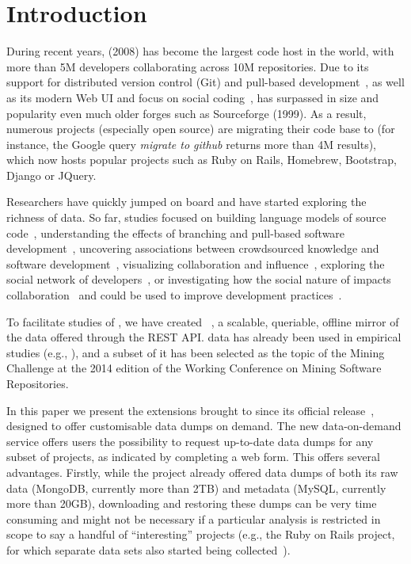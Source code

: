 
\section{Introduction}
\label{sec:intro}

During recent years, \gh (2008) has become the largest code host in the world, with more than 5M developers
collaborating across 10M repositories.
Due to its support for distributed version control (Git) and pull-based development~\cite{barr2012cohesive}, 
as well as its modern Web UI and focus on social coding~\cite{dabbish2012social}, \gh has surpassed in size
and popularity even much older forges such as Sourceforge (1999).
As a result, numerous projects (especially open source) are migrating their code base to \gh (for instance, 
the Google query \emph{migrate to github} returns more than 4M results), which now hosts popular projects
such as Ruby on Rails, Homebrew, Bootstrap, Django or JQuery.

Researchers have quickly jumped on board and have started exploring the richness of \gh data.
So far, studies focused on 
building language models of source code~\cite{allamanis2013mining}, 
understanding the effects of branching and pull-based software development~\cite{lee2013git, gousios2014exploratory}, 
uncovering associations between crowdsourced knowledge and software development~\cite{vasilescu2013stackoverflow},
visualizing collaboration and influence~\cite{heller2011visualizing}, 
exploring the social network of developers~\cite{thung2013network, schall2013follow, jiang2013understanding},
or investigating how the social nature of \gh impacts collaboration~\cite{dabbish2012social, marlow2013impression}
and could be used to improve development practices~\cite{pham2013creating, pham2013building}.

To facilitate studies of \gh, we have created \ght~\cite{gousios2012ghtorrent, gousios2013ghtorent}, a scalable, 
queriable, offline mirror of the data offered through the \gh REST API.
\ght data has already been used in empirical studies (e.g., \cite{gousios2014exploratory, squire2014forge, 
vasilescu2013stackoverflow}), and a subset of it has been selected as the topic of the Mining Challenge
at the 2014 edition of the Working Conference on Mining Software Repositories.

In this paper we present the extensions brought to \ght since its official release~\cite{gousios2013ghtorent},
designed to offer customisable data dumps on demand.
The new \ght data-on-demand service offers users the possibility to request up-to-date \ght data dumps for 
any subset of \gh projects, as indicated by completing a web form.
This offers several advantages.
Firstly, while the \ght project already offered data dumps of both its raw data (MongoDB, currently more than 2TB) 
and metadata (MySQL, currently more than 20GB), downloading and restoring these dumps can be 
very time consuming and might not be necessary if a particular analysis is restricted in scope to say a handful
of ``interesting'' \gh projects (e.g., the Ruby on Rails project, for which separate data sets also started being 
collected~\cite{wagstrom2013network}).

